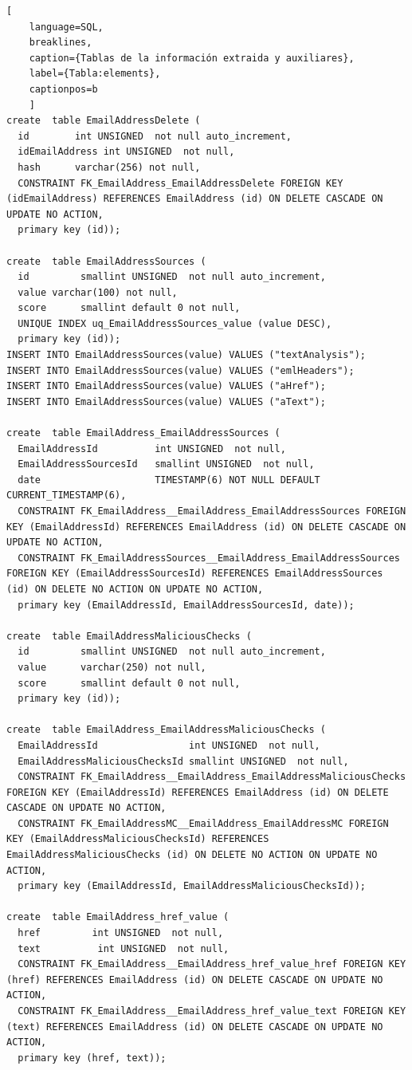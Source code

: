 \begin{lstlisting}[
    language=SQL,
    breaklines, 
    caption={Tablas de la información extraida y auxiliares}, 
    label={Tabla:elements}, 
    captionpos=b
    ]
create  table EmailAddressDelete (
  id        int UNSIGNED  not null auto_increment, 
  idEmailAddress int UNSIGNED  not null, 
  hash      varchar(256) not null, 
  CONSTRAINT FK_EmailAddress_EmailAddressDelete FOREIGN KEY (idEmailAddress) REFERENCES EmailAddress (id) ON DELETE CASCADE ON UPDATE NO ACTION,
  primary key (id));

create  table EmailAddressSources (
  id         smallint UNSIGNED  not null auto_increment, 
  value varchar(100) not null, 
  score      smallint default 0 not null, 
  UNIQUE INDEX uq_EmailAddressSources_value (value DESC),
  primary key (id));
INSERT INTO EmailAddressSources(value) VALUES ("textAnalysis");
INSERT INTO EmailAddressSources(value) VALUES ("emlHeaders");
INSERT INTO EmailAddressSources(value) VALUES ("aHref");
INSERT INTO EmailAddressSources(value) VALUES ("aText");

create  table EmailAddress_EmailAddressSources (
  EmailAddressId          int UNSIGNED  not null, 
  EmailAddressSourcesId   smallint UNSIGNED  not null,
  date                    TIMESTAMP(6) NOT NULL DEFAULT CURRENT_TIMESTAMP(6),
  CONSTRAINT FK_EmailAddress__EmailAddress_EmailAddressSources FOREIGN KEY (EmailAddressId) REFERENCES EmailAddress (id) ON DELETE CASCADE ON UPDATE NO ACTION,
  CONSTRAINT FK_EmailAddressSources__EmailAddress_EmailAddressSources FOREIGN KEY (EmailAddressSourcesId) REFERENCES EmailAddressSources (id) ON DELETE NO ACTION ON UPDATE NO ACTION,
  primary key (EmailAddressId, EmailAddressSourcesId, date));

create  table EmailAddressMaliciousChecks (
  id         smallint UNSIGNED  not null auto_increment, 
  value      varchar(250) not null, 
  score      smallint default 0 not null, 
  primary key (id));

create  table EmailAddress_EmailAddressMaliciousChecks (
  EmailAddressId                int UNSIGNED  not null, 
  EmailAddressMaliciousChecksId smallint UNSIGNED  not null,
  CONSTRAINT FK_EmailAddress__EmailAddress_EmailAddressMaliciousChecks FOREIGN KEY (EmailAddressId) REFERENCES EmailAddress (id) ON DELETE CASCADE ON UPDATE NO ACTION,
  CONSTRAINT FK_EmailAddressMC__EmailAddress_EmailAddressMC FOREIGN KEY (EmailAddressMaliciousChecksId) REFERENCES EmailAddressMaliciousChecks (id) ON DELETE NO ACTION ON UPDATE NO ACTION,
  primary key (EmailAddressId, EmailAddressMaliciousChecksId));
  
create  table EmailAddress_href_value (
  href         int UNSIGNED  not null, 
  text          int UNSIGNED  not null, 
  CONSTRAINT FK_EmailAddress__EmailAddress_href_value_href FOREIGN KEY (href) REFERENCES EmailAddress (id) ON DELETE CASCADE ON UPDATE NO ACTION,
  CONSTRAINT FK_EmailAddress__EmailAddress_href_value_text FOREIGN KEY (text) REFERENCES EmailAddress (id) ON DELETE CASCADE ON UPDATE NO ACTION,
  primary key (href, text));





\end{lstlisting}
